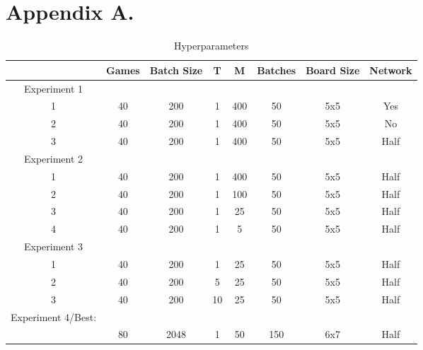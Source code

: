 \documentclass[twoside,11pt]{article}
\begin{document}
\section*{Appendix A.}
\begin{table}[ht]
    \caption{Hyperparameters}
    \vspace{.3in}
\begin{center}
    \begin{tabular}{||c ||c |c |c |c|c|c|c }
             & Games & Batch Size & T & M & Batches & Board Size &Network\\
             \hline
            Experiment 1&&&&& \\
            1 & 40 & 200 & 1 & 400 & 50 & 5x5 & Yes\\
            2 & 40 & 200 & 1 & 400  & 50 & 5x5 & No\\
            3 & 40 & 200 & 1 & 400 &  50 & 5x5 &Half\\
            \hline
            Experiment 2&&& && \\
            1 & 40 & 200& 1 & 400 &  50 & 5x5 &Half\\
            2 & 40 & 200& 1 & 100 &  50 & 5x5 &Half\\
            3 & 40 & 200& 1 & 25 &  50 & 5x5 &Half\\
            4 & 40 & 200& 1 & 5 &  50 & 5x5 &Half\\
            \hline
            Experiment 3&&&&& \\
            1 & 40 & 200& 1 & 25 &  50 & 5x5 &Half\\
            2 & 40 & 200 & 5 & 25 &  50 & 5x5 &Half\\
            3 & 40 & 200 & 10 & 25 & 50& 5x5 &Half\\
            \hline
            Experiment 4/Best:&&&&& \\
            & 80 & 2048 & 1 & 50 & 150& 6x7 & Half
        \end{tabular}
    \end{center}
\end{table}
\end{document}
